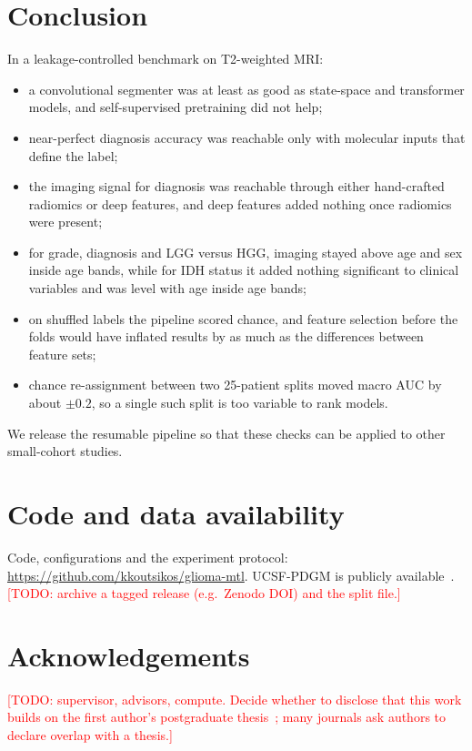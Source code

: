 \documentclass[11pt]{article}
\newcommand{\todo}[1]{\textcolor{red}{[TODO: #1]}}
\begin{document}
\section{Conclusion}
In a leakage-controlled benchmark on T2-weighted MRI:
\begin{itemize}
  \item a convolutional segmenter was at least as good as state-space and transformer models, and self-supervised
        pretraining did not help;
  \item near-perfect diagnosis accuracy was reachable only with molecular inputs that define the label;
  \item the imaging signal for diagnosis was reachable through either hand-crafted radiomics or deep features, and deep
        features added nothing once radiomics were present;
  \item for grade, diagnosis and LGG versus HGG, imaging stayed above age and sex inside age bands, while for IDH status
        it added nothing significant to clinical variables and was level with age inside age bands;
  \item on shuffled labels the pipeline scored chance, and feature selection before the folds would have inflated
        results by as much as the differences between feature sets;
  \item chance re-assignment between two 25-patient splits moved macro AUC by about $\pm 0.2$, so a single such split is
        too variable to rank models.
\end{itemize}
We release the resumable pipeline so that these checks can be applied to other small-cohort studies.

\section*{Code and data availability}
Code, configurations and the experiment protocol: \url{https://github.com/kkoutsikos/glioma-mtl}. UCSF-PDGM is
publicly available~\cite{calabrese2022ucsf}. \todo{archive a tagged release (e.g.\ Zenodo DOI) and the split file.}

\section*{Acknowledgements}
\todo{supervisor, advisors, compute. Decide whether to disclose that this work builds on the first author's
postgraduate thesis~\cite{koutsikos2026thesis}; many journals ask authors to declare overlap with a thesis.}
\end{document}
